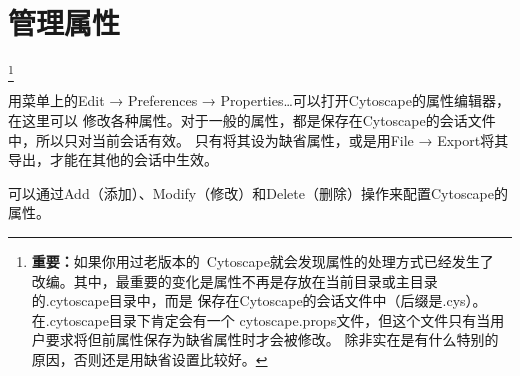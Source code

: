 \section{管理属性}
\footnote{{\bf 重要：}如果你用过老版本的~Cytoscape就会发现属性的处理方式已经发生了
改编。其中，最重要的变化是属性不再是存放在当前目录或主目录的.cytoscape目录中，而是
保存在Cytoscape的会话文件中（后缀是.cys）。在.cytoscape目录下肯定会有一个
cytoscape.props文件，但这个文件只有当用户要求将但前属性保存为缺省属性时才会被修改。
除非实在是有什么特别的原因，否则还是用缺省设置比较好。}

用菜单上的Edit → Preferences → Properties…可以打开Cytoscape的属性编辑器，在这里可以
修改各种属性。对于一般的属性，都是保存在Cytoscape的会话文件中，所以只对当前会话有效。
只有将其设为缺省属性，或是用File → Export将其导出，才能在其他的会话中生效。

可以通过Add（添加）、Modify（修改）和Delete（删除）操作来配置Cytoscape的属性。 